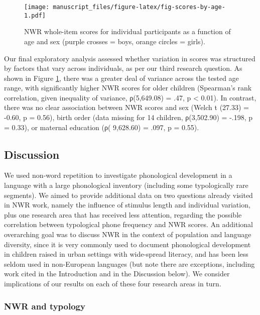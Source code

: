 \documentclass[
  english,
  ,man,floatsintext]{apa6}
\begin{document}
\begin{figure}
\centering
\texttt{[image: manuscript\_files/figure-latex/fig-scores-by-age-1.pdf]}
\caption{\label{fig:fig-scores-by-age}NWR whole-item scores for individual participants as a function of age and sex (purple crosses = boys, orange circles = girls).}
\end{figure}

Our final exploratory analysis assessed whether variation in scores was structured by factors that vary across individuals, as per our third research question. As shown in Figure \ref{fig:fig-scores-by-age}, there was a greater deal of variance across the tested age range, with significantly higher NWR scores for older children (Spearman's rank correlation, given inequality of variance, ρ(5,649.08) = .47, p \textless{} 0.01). In contrast, there was no clear association between NWR scores and sex (Welch t (27.33) = -0.60, p = 0.56), birth order (data missing for 14 children, ρ(3,502.90) = -.198, p = 0.33), or maternal education (ρ( 9,628.60) = .097, p = 0.55).

\hypertarget{discussion}{%
\subsection{Discussion}\label{discussion}}

We used non-word repetition to investigate phonological development in a language with a large phonological inventory (including some typologically rare segments). We aimed to provide additional data on two questions already visited in NWR work, namely the influence of stimulus length and individual variation, plus one research area that has received less attention, regarding the possible correlation between typological phone frequency and NWR scores. An additional overarching goal was to discuss NWR in the context of population and language diversity, since it is very commonly used to document phonological development in children raised in urban settings with wide-spread literacy, and has been less seldom used in non-European languages (but note there are exceptions, including work cited in the Introduction and in the Discussion below). We consider implications of our results on each of these four research areas in turn.

\hypertarget{nwr-and-typology-1}{%
\subsubsection{NWR and typology}\label{nwr-and-typology-1}}
\end{document}
